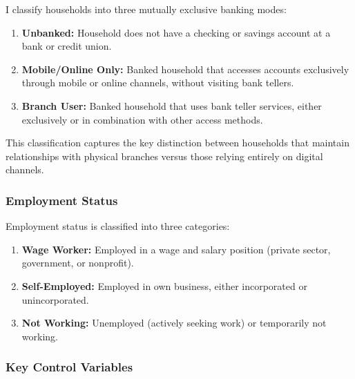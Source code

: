 \documentclass[12pt]{article}
\begin{document}
I classify households into three mutually exclusive banking modes:

\begin{enumerate}
    \item \textbf{Unbanked:} Household does not have a checking or savings account at a bank or credit union.

    \item \textbf{Mobile/Online Only:} Banked household that accesses accounts exclusively through mobile or online channels, without visiting bank tellers.

    \item \textbf{Branch User:} Banked household that uses bank teller services, either exclusively or in combination with other access methods.
\end{enumerate}

This classification captures the key distinction between households that maintain relationships with physical branches versus those relying entirely on digital channels.

\subsubsection{Employment Status}

Employment status is classified into three categories:

\begin{enumerate}
    \item \textbf{Wage Worker:} Employed in a wage and salary position (private sector, government, or nonprofit).

    \item \textbf{Self-Employed:} Employed in own business, either incorporated or unincorporated.

    \item \textbf{Not Working:} Unemployed (actively seeking work) or temporarily not working.
\end{enumerate}

\subsubsection{Key Control Variables}
\end{document}

